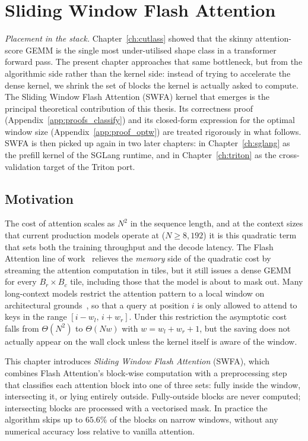 \chapter{Sliding Window Flash Attention}\label{ch:swfa}

\emph{Placement in the stack.} Chapter~\ref{ch:cutlass} showed
that the skinny attention-score GEMM is the single most
under-utilised shape class in a transformer forward pass. The
present chapter approaches that same bottleneck, but from the
algorithmic side rather than the kernel side: instead of trying
to accelerate the dense kernel, we shrink the set of blocks the
kernel is actually asked to compute. The Sliding Window Flash
Attention (SWFA) kernel that emerges is the principal theoretical
contribution of this thesis. Its correctness proof
(Appendix~\ref{app:proofs_classify}) and its closed-form
expression for the optimal window size
(Appendix~\ref{app:proof_optw}) are treated rigorously in what
follows. SWFA is then picked up again in two later chapters: in
Chapter~\ref{ch:sglang} as the prefill kernel of the SGLang
runtime, and in Chapter~\ref{ch:triton} as the cross-validation
target of the Triton port.

\section{Motivation}\label{sec:swfa_motivation}
The cost of attention scales as $N^2$ in the sequence length, and
at the context sizes that current production models operate at
($N \geq 8{,}192$) it is this quadratic term that sets both the
training throughput and the decode latency. The Flash Attention
line of work~\cite{dao2022flashattention,dao2023flashattention2}
relieves the \emph{memory} side of the quadratic cost by streaming
the attention computation in tiles, but it still issues a dense
GEMM for every $B_r \times B_c$ tile, including those that the
model is about to mask out. Many long-context models restrict the
attention pattern to a local window on architectural
grounds~\cite{beltagy2020longformer,zaheer2020bigbird}, so that a
query at position $i$ is only allowed to attend to keys in the
range $[i - w_l,\, i + w_r]$. Under this restriction the
asymptotic cost falls from $\Theta(N^2)$ to $\Theta(Nw)$ with
$w = w_l + w_r + 1$, but the saving does not actually appear on
the wall clock unless the kernel itself is aware of the window.

This chapter introduces \emph{Sliding Window Flash Attention}
(SWFA), which combines Flash Attention's block-wise computation
with a preprocessing step that classifies each attention block
into one of three sets: fully inside the window, intersecting it,
or lying entirely outside. Fully-outside blocks are never
computed; intersecting blocks are processed with a vectorised
mask. In practice the algorithm skips up to $65.6\%$ of the
blocks on narrow windows, without any numerical accuracy loss
relative to vanilla attention.

